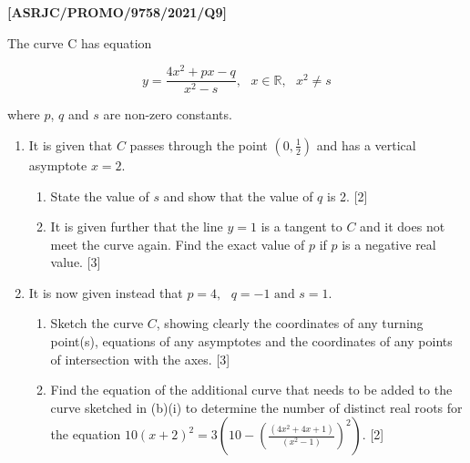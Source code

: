 \item \textbf{{[}ASRJC/PROMO/9758/2021/Q9{]} }

The curve C has equation 

\[
y=\frac{4x^{2}+px-q}{x^{2}-s},\text{ }x\in\mathbb{R},\text{ }x^{2}\ne s
\]

where $p$, $q$ and $s$ are non-zero constants. 
\begin{enumerate}
\item It is given that $C$ passes through the point $\left(0,\frac{1}{2}\right)$
and has a vertical asymptote $x=2$. 
\begin{enumerate}
\item State the value of $s$ and show that the value of $q$ is 2. \hfill{}{[}2{]}
\item It is given further that the line $y=1$ is a tangent to $C$ and
it does not meet the curve again. Find the exact value of $p$ if
$p$ is a negative real value. \hfill{}{[}3{]}
\end{enumerate}
\item It is now given instead that $p=4,\text{ }q=-1\text{ and }s=1$. 
\begin{enumerate}
\item Sketch the curve $C$, showing clearly the coordinates of any turning
point(s), equations of any asymptotes and the coordinates of any points
of intersection with the axes. \hfill{}{[}3{]}
\item Find the equation of the additional curve that needs to be added to
the curve sketched in (b)(i) to determine the number of distinct real
roots for the equation $10(x+2)^{2}=3\left(10-\left(\frac{(4x^{2}+4x+1)}{(x^{2}-1)}\right)^{2}\right)$.
\hfill{}{[}2{]}
\end{enumerate}
\end{enumerate}